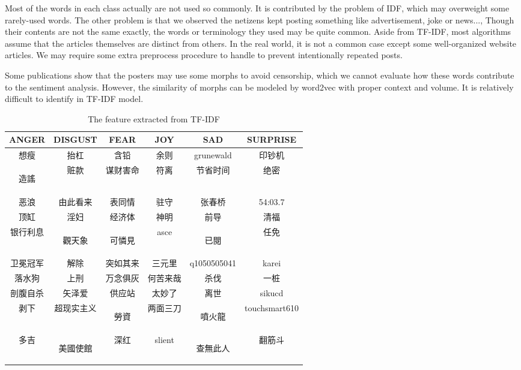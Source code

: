 Most of the words in each class actually are not used so commonly. It is contributed by the problem of IDF, which may overweight some rarely-used words.
The other problem is that we observed the netizens kept posting something like advertisement, joke or news..., 
Though their contents are not the same exactly, the words or terminology they used may be quite common. 
Aside from TF-IDF, most algorithms assume that the articles themselves are distinct from others. In the real world, it is not a common case except some well-organized website articles.
We may require some extra preprocess procedure to handle to prevent intentionally repeated posts.

Some publications \cite{Chen2013TUP25129382512940} show that the posters may use some morphs to avoid censorship, which we cannot evaluate how these words contribute to the sentiment analysis. 
However, the similarity of morphs can be modeled by word2vec with proper context and volume. 
It is relatively difficult to identify in TF-IDF model. 
\begin{CJK}{UTF8}{gbsn}
\begin{table}[]
\centering
\caption{The feature extracted from TF-IDF}
\label{table:featureoftfidf}
\begin{tabular}{|c|c|c|c|c|c|}
ANGER	& DISGUST	& FEAR	& JOY	& SAD	& SURPRISE \\
\hline
想瘦	&抬杠	&含铅	&余则	&grunewald	&印钞机 \\
\begin{CJK}{UTF8}{bkai}造謠\end{CJK}	&赃款	&谋财害命	&符离	&节省时间	&绝密\\
恶浪	&由此看来	&表同情	&驻守	&张春桥	&54:03.7\\
顶缸	&淫妇	&经济体	&神明	&前导	&清福\\
银行利息	&\begin{CJK}{UTF8}{bkai}觀天象\end{CJK}	&\begin{CJK}{UTF8}{bkai}可憐見\end{CJK}	&asce	&\begin{CJK}{UTF8}{bkai}已閱\end{CJK}	&任免\\
卫冕冠军	&解除	&突如其来	&三元里	&q1050505041	&karei\\
落水狗	&上刑	&万念俱灰	&何苦来哉	&杀伐	&一桩\\
剖腹自杀	&矢泽爱	&供应站	&太妙了	&离世	&sikucd\\
剥下	&超现实主义	&\begin{CJK}{UTF8}{bkai}勞資\end{CJK}	&两面三刀	&\begin{CJK}{UTF8}{bkai}噴火龍\end{CJK}	&touchsmart610\\
多吉	&\begin{CJK}{UTF8}{bkai}美國使館\end{CJK}	&深红	&slient	&\begin{CJK}{UTF8}{bkai}查無此人\end{CJK}	&翻筋斗
\end{tabular}
\end{table}
\end{CJK}

